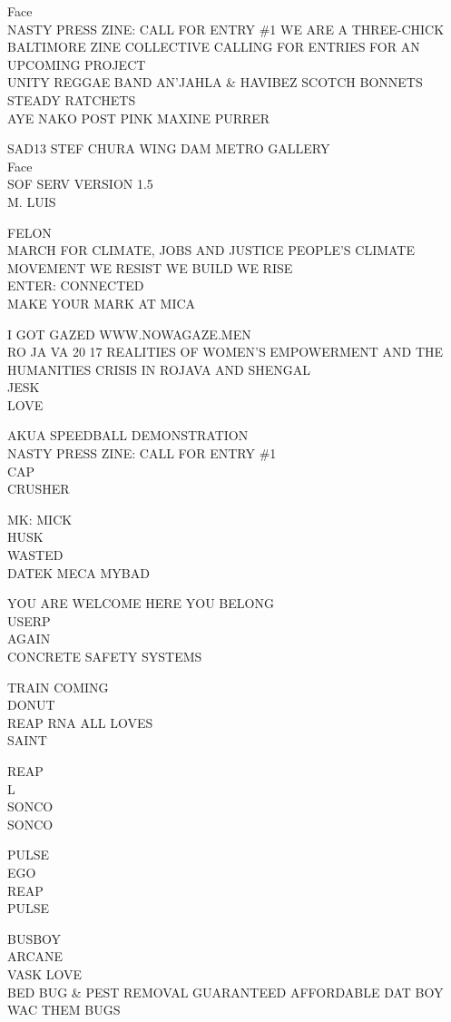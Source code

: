 \documentclass[10pt,letterpaper]{article}
\begin{document}
Face\\
NASTY PRESS ZINE: CALL FOR ENTRY \#1 WE ARE A THREE{-}CHICK BALTIMORE ZINE COLLECTIVE CALLING FOR ENTRIES FOR AN UPCOMING PROJECT\\
UNITY REGGAE BAND AN'JAHLA \& HAVIBEZ SCOTCH BONNETS STEADY RATCHETS\\
AYE NAKO POST PINK MAXINE PURRER

SAD13 STEF CHURA WING DAM METRO GALLERY\\
Face\\
SOF SERV VERSION 1.5\\
M. LUIS

FELON\\
MARCH FOR CLIMATE, JOBS AND JUSTICE PEOPLE'S CLIMATE MOVEMENT WE RESIST WE BUILD WE RISE\\
ENTER: CONNECTED\\
MAKE YOUR MARK AT MICA

I GOT GAZED WWW.NOWAGAZE.MEN\\
RO JA VA 20 17 REALITIES OF WOMEN'S EMPOWERMENT AND THE HUMANITIES CRISIS IN ROJAVA AND SHENGAL\\
JESK\\
LOVE

AKUA SPEEDBALL DEMONSTRATION\\
NASTY PRESS ZINE: CALL FOR ENTRY \#1\\
CAP\\
CRUSHER

MK: MICK\\
HUSK\\
WASTED\\
DATEK MECA MYBAD

YOU ARE WELCOME HERE YOU BELONG\\
USERP\\
AGAIN\\
CONCRETE SAFETY SYSTEMS

TRAIN COMING\\
DONUT\\
REAP RNA ALL LOVES\\
SAINT

REAP\\
L\\
SONCO\\
SONCO

PULSE\\
EGO\\
REAP\\
PULSE

BUSBOY\\
ARCANE\\
VASK LOVE\\
BED BUG \& PEST REMOVAL GUARANTEED AFFORDABLE DAT BOY WAC THEM BUGS
\end{document}
